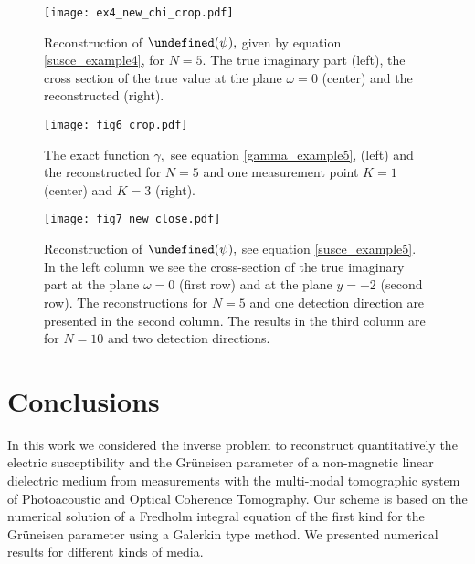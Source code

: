 \documentclass[a4paper,twoside,10pt]{article}
\theoremstyle{break}
\theoremstyle{nonumberplain}
\let\IM\Im
\let\Im=\undefined
\DeclareMathOperator{\Im}{\IM m}
\begin{document}
\begin{figure}[t]
\begin{center}
\texttt{[image: ex4\_new\_chi\_crop.pdf]}
\caption{Reconstruction of $\Im (\psi ),$ given by equation \eqref{susce_example4}, for $N=5$. The true imaginary part (left), the cross section of the true value at the plane $\omega=0$ (center) and the reconstructed (right).}\label{Fig5}
\end{center}
\end{figure}
 
\begin{figure}[t]
\begin{center}
\texttt{[image: fig6\_crop.pdf]}
\caption{The exact function $\gamma,$ see equation \eqref{gamma_example5}, (left) and the reconstructed for $N=5$ and one measurement point $K=1$ (center) and $K=3$ (right).}\label{Fig6}
\end{center}
\end{figure}




\begin{figure}[t]
\begin{center}
\texttt{[image: fig7\_new\_close.pdf]}
\caption{Reconstruction of $\Im (\psi ),$ see equation \eqref{susce_example5}. In the left column we see the cross-section of the true imaginary part at the plane $\omega = 0$ (first row) and at the plane $y=-2$ (second row). The reconstructions for $N=5$ and one detection direction are presented in the second column. The results in the third column are for $N=10$ and two detection directions. }\label{Fig7}
\end{center}
\end{figure}


\section{Conclusions}
In this work we considered the inverse problem to reconstruct quantitatively the electric susceptibility and the Gr\"uneisen parameter of a non-magnetic linear dielectric medium from measurements with the multi-modal tomographic system of Photoacoustic and Optical Coherence Tomography. 
Our scheme is based on the numerical solution of a Fredholm integral equation of the first kind for the Gr\"uneisen parameter using a Galerkin type method. We presented numerical results for different kinds of media.

\end{document}
